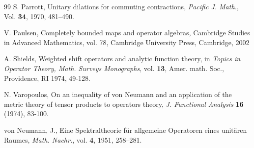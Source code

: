 \documentclass[12pt,reqno] {amsart}
\theoremstyle{remark}
\theoremstyle{definition}
\begin{document}
\begin{thebibliography}{99}
S. Parrott, Unitary dilations for commuting contractions, \textit{Pacific J. Math.},
    Vol. \textbf{34}, 1970, 481--490.

 V. Paulsen, Completely bounded maps and operator algebras, Cambridge Studies in
Advanced Mathematics, vol. 78, Cambridge University Press, Cambridge, 2002


 A. Shields, Weighted shift operators and analytic function theory, in \textit{Topics in Operator
Theory, Math. Surveys Monographs}, vol. \textbf{13}, Amer. math. Soc., Providence, RI 1974, 49-128.

N. Varopoulos, On an inequality of von Neumann and an application of the metric theory of tensor products to operators theory, {\it J. Functional Analysis} {\bf 16} (1974), 83-100.


    von Neumann, J.,
     Eine {S}pektraltheorie f\"ur allgemeine {O}peratoren eines unit\"aren {R}aumes,
   \textit{Math. Nachr.}, vol. \textbf{4}, 1951, 258--281.



    \end{thebibliography}
\end{document}
